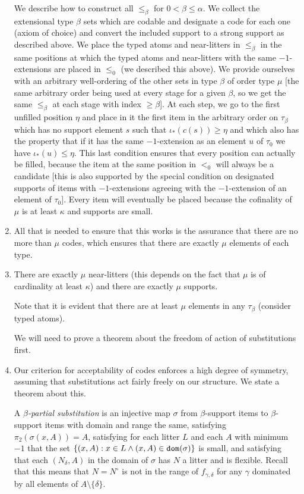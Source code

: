 \documentclass[12pt]{article}
\begin{document}
\begin{enumerate}
We describe how to construct all $\leq_\beta$ for $0<\beta \leq \alpha$.  We collect the extensional type $\beta$ sets which are codable and designate a code for each one (axiom of choice) and convert the included support to a strong support as described above. We place the typed atoms and near-litters  in $\leq_\beta$ in the same positions at which the typed atoms and near-litters with the same $-1$-extensions are placed in
$\leq_0$ (we described this above).  We provide ourselves with an arbitrary well-ordering of the other sets in type $\beta$ of order type $\mu$ [the same arbitrary order being used at every stage for a given $\beta$, so we get the same $\leq_\beta$ at each stage with index $\geq\beta$].  At each step, we go to the first unfilled position $\eta$ and place in it the first item in the arbitrary order on $\tau_\beta$ which has no support element $s$ such that $\iota_*(c(s))\geq \eta$ and which also has the property that
if it has the same $-1$-extension as an element $u$ of $\tau_0$ we have $\iota_*(u) \leq \eta$.  This last condition ensures that every position can actually be filled, because the item at the same position in $<_0$ will always be a candidate [this is also supported by the special condition on designated supports of items with $-1$-extensions agreeing with the $-1$-extension of an element of $\tau_0$].  Every item will eventually be placed because the cofinality of $\mu$ is at least $\kappa$ and supports are small.

\item All that is needed to ensure that this works is the assurance that there are no more than $\mu$ codes, which ensures that there are exactly $\mu$ elements of each type.

\item  There are exactly $\mu$ near-litters (this depends on the fact that $\mu$ is of cardinality at least $\kappa$) and there are exactly $\mu$ supports.

Note that it is evident that there are at least $\mu$ elements in any $\tau_\beta$ (consider typed atoms).

We will need to prove a theorem about the freedom of action of substitutions first.

\item Our criterion for acceptability of codes enforces a high degree of symmetry, assuming that substitutions act fairly freely on our structure.  We state a theorem about this.

A {\em $\beta$-partial substitution\/} is an injective map $\sigma$ from $\beta$-support items to $\beta$-support items with domain and range the same, satisfying $\pi_2(\sigma(x,A)) = A$, satisfying for each litter $L$ and each $A$ with minimum $-1$ that the set $\{(x,A): x \in L \wedge (x,A) \in {\tt dom}(\sigma)\}$ is small, and satisfying that each $(N_\delta,A)$
in the domain of $\sigma$ has $N$ a litter and is flexible.  Recall that this means that $N=N^\circ$ is not in the range of $f_{\gamma,\delta}$ for any $\gamma$ dominated by all elements of $A \setminus \{\delta\}$.


\end{enumerate}
\end{document}
